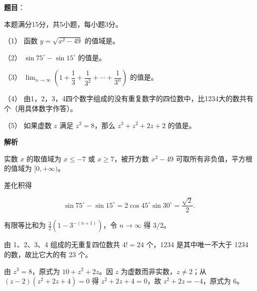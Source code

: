 \begin{answer}

\textbf{题目}：

本题满分15分，共5小题，每小题3分。

（1） 函数 $y=\sqrt{x^2-49}$ 的值域是\gkblank{}。

（2） $\sin75^\circ-\sin15^\circ$ 的值是\gkblank{}。

（3） $\displaystyle\lim_{n\to\infty}\left(1+\dfrac13+\dfrac1{3^2}+\cdots+\dfrac1{3^n}\right)$ 的值是\gkblank{}。

（4） 由1，2，3，4四个数字组成的没有重复数字的四位数中，比1234大的数共有\gkblank{}个（用具体数字作答）。

（5） 如果虚数 $z$ 满足 $z^3=8$，那么 $z^3+z^2+2z+2$ 的值是\gkblank{}。

\textbf{解析}


实数 $x$ 的取值域为 $x\le-7$ 或 $x\ge7$，被开方数 $x^2-49$ 可取所有非负值，平方根的值域为 $[0,+\infty)$。


差化积得

\nopagebreak[4]
\[\sin75^\circ-\sin15^\circ=2\cos45^\circ\sin30^\circ=\frac{\sqrt2}{2}.\]


有限等比和为 $\frac32(1-3^{-(n+1)})$，令 $n\to\infty$ 得 $3/2$。


由 1、2、3、4 组成的无重复四位数共 $4!=24$ 个，1234 是其中唯一不大于 1234 的数，故比它大的有 23 个。


由 $z^3=8$，原式为 $10+z^2+2z$。因 $z$ 为虚数而非实数，$z\ne2$；从 $(z-2)(z^2+2z+4)=0$ 得 $z^2+2z+4=0$，故 $z^2+2z=-4$，原式为 6。

\gkanswer{答案（1）：$[0,+\infty)$}





\end{answer}
